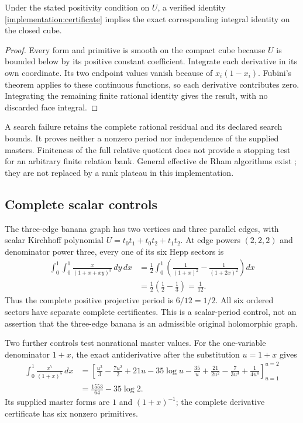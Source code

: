 \begin{proposition}
Under the stated positivity condition on $U$, a verified identity
\eqref{implementation:certificate} implies the exact corresponding
integral identity on the closed cube.
\end{proposition}
\begin{proof}
Every form and primitive is smooth on the compact cube because
$U$ is bounded below by its positive constant coefficient.
Integrate each derivative in its own coordinate. Its two endpoint
values vanish because of $x_i(1-x_i)$. Fubini's theorem applies
to these continuous functions, so each derivative contributes
zero. Integrating the remaining finite rational identity gives
the result, with no discarded face integral.
\end{proof}

A search failure retains the complete rational residual and its
declared search bounds. It proves neither a nonzero period nor
independence of the supplied masters. Finiteness of the full
relative quotient does not provide a stopping test for an arbitrary
finite relation bank. General effective de Rham algorithms exist
\cite{oaku2001,walther2000}; they are not replaced by a rank plateau
in this implementation.

\subsection{Complete scalar controls}

The three-edge banana graph has two vertices and three parallel
edges, with scalar Kirchhoff polynomial
$U=t_0t_1+t_0t_2+t_1t_2$. At edge powers $(2,2,2)$ and denominator
power three, every one of its six Hepp sectors is
\begin{align}
 \int_0^1\int_0^1\frac{x}{(1+x+xy)^3}\,dy\,dx
 &=\frac12\int_0^1\left(\frac1{(1+x)^2}
                         -\frac1{(1+2x)^2}\right)dx\nonumber\\
 &=\frac12\left(\frac12-\frac13\right)=\frac1{12}.
 \label{implementation:banana}
\end{align}
Thus the complete positive projective period is $6/12=1/2$.
All six ordered sectors have separate complete certificates.
This is a scalar-period control, not an assertion that the
three-edge banana is an admissible original holomorphic graph.

Two further controls test nonrational master values. For the
one-variable denominator $1+x$, the exact antiderivative after
the substitution $u=1+x$ gives
\begin{align}
 \int_0^1\frac{x^7}{(1+x)^5}\,dx
 &=\left[
 \frac{u^3}{3}-\frac{7u^2}{2}+21u-35\log u
 -\frac{35}{u}+\frac{21}{2u^2}-\frac{7}{3u^3}
 +\frac{1}{4u^4}\right]_{u=1}^{u=2}\nonumber\\
 &=\frac{1553}{64}-35\log2.
 \label{implementation:onevar}
\end{align}
Its supplied master forms are $1$ and $(1+x)^{-1}$; the complete
derivative certificate has six nonzero primitives.

